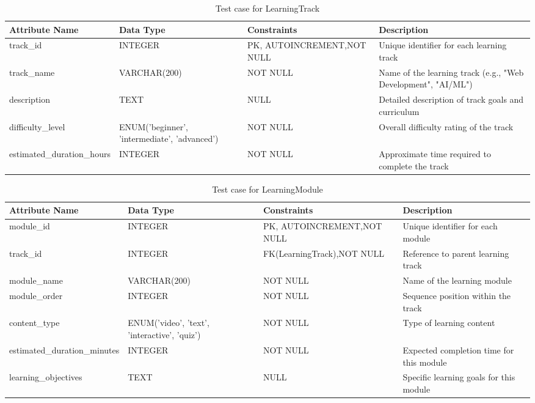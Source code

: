 \documentclass{FastFyp}
\begin{document}
\begin{samepage}


\begin{table}[H]
\footnotesize
\centering
\caption{Test case for LearningTrack}
\begin{tabular}{|p{3cm}|p{2.3cm}|p{3.8cm}|p{4.4cm}|}
\hline
Attribute Name & Data Type & Constraints & Description \\ \hline
track\_id & INTEGER & PK, AUTO\newline INCREMENT,\newline NOT NULL & Unique identifier for each learning track \\ \hline
track\_name & VARCHAR(200) & NOT NULL & Name of the learning track (e.g., "Web Development", "AI/ML") \\ \hline
description & TEXT & NULL & Detailed description of track goals and curriculum \\ \hline
difficulty\_level & ENUM('beginner', 'intermediate', 'advanced') & NOT NULL & Overall difficulty rating of the track \\ \hline
estimated\_duration\_hours & INTEGER & NOT NULL & Approximate time required to complete the track \\ \hline
\end{tabular}
\end{table}
\end{samepage}

\begin{samepage}


\begin{table}[H]
\footnotesize
\centering
\caption{Test case for LearningModule}
\begin{tabular}{|p{3cm}|p{2.3cm}|p{3.8cm}|p{4.4cm}|}
\hline
Attribute Name & Data Type & Constraints & Description \\ \hline
module\_id & INTEGER & PK, AUTO\newline INCREMENT,\newline NOT NULL & Unique identifier for each module \\ \hline
track\_id & INTEGER & FK(LearningTrack),\newline NOT NULL & Reference to parent learning track \\ \hline
module\_name & VARCHAR(200) & NOT NULL & Name of the learning module \\ \hline
module\_order & INTEGER & NOT NULL & Sequence position within the track \\ \hline
content\_type & ENUM('video', 'text', 'interactive', 'quiz') & NOT NULL & Type of learning content \\ \hline
estimated\_duration\_minutes & INTEGER & NOT NULL & Expected completion time for this module \\ \hline
learning\_objectives & TEXT & NULL & Specific learning goals for this module \\ \hline
\end{tabular}
\end{table}
\end{samepage}
\end{document}
